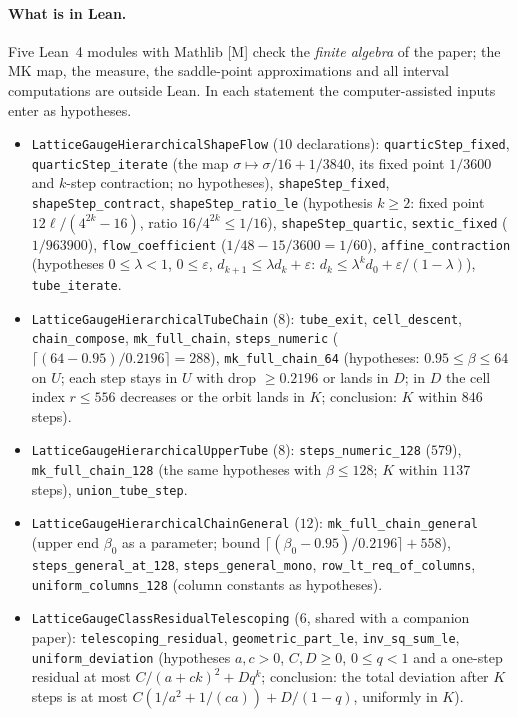 \documentclass[11pt,a4paper]{article}
\theoremstyle{definition}
\theoremstyle{remark}
\newcommand{\code}[1]{\texttt{#1}}
\begin{document}
{\sloppy
\paragraph{What is in Lean.}
Five Lean~4 modules with Mathlib [M] check the \emph{finite algebra} of the paper; the MK map, the measure, the saddle-point approximations and all interval computations are outside Lean.
In each statement the computer-assisted inputs enter as hypotheses.
\begin{itemize}[nosep]
\item \code{LatticeGaugeHierarchicalShapeFlow} ($10$ declarations): \code{quarticStep\_fixed}, \code{quarticStep\_iterate} (the map $\sigma\mapsto\sigma/16+1/3840$, its fixed point $1/3600$ and $k$-step contraction; no hypotheses), \code{shapeStep\_fixed}, \code{shapeStep\_contract}, \code{shapeStep\_ratio\_le} (hypothesis $k\ge2$: fixed point $12\ell/(4^{2k}-16)$, ratio $16/4^{2k}\le1/16$), \code{shapeStep\_quartic}, \code{sextic\_fixed} ($1/963900$), \code{flow\_coefficient} ($1/48-15/3600=1/60$), \code{affine\_contraction} (hypotheses $0\le\lambda<1$, $0\le\varepsilon$, $d_{k+1}\le\lambda d_k+\varepsilon$: $d_k\le\lambda^kd_0+\varepsilon/(1-\lambda)$), \code{tube\_iterate}.
\item \code{LatticeGaugeHierarchicalTubeChain} ($8$): \code{tube\_exit}, \code{cell\_descent}, \code{chain\_compose}, \code{mk\_full\_chain}, \code{steps\_numeric} ($\lceil(64-0.95)/0.2196\rceil=288$), \code{mk\_full\_chain\_64} (hypotheses: $0.95\le\beta\le64$ on $U$; each step stays in $U$ with drop $\ge0.2196$ or lands in $D$; in $D$ the cell index $r\le556$ decreases or the orbit lands in $K$; conclusion: $K$ within $846$ steps).
\item \code{LatticeGaugeHierarchicalUpperTube} ($8$): \code{steps\_numeric\_128} ($579$), \code{mk\_full\_chain\_128} (the same hypotheses with $\beta\le128$; $K$ within $1137$ steps), \code{union\_tube\_step}.
\item \code{LatticeGaugeHierarchicalChainGeneral} ($12$): \code{mk\_full\_chain\_general} (upper end $\beta_0$ as a parameter; bound $\lceil(\beta_0-0.95)/0.2196\rceil+558$), \code{steps\_general\_at\_128}, \code{steps\_general\_mono}, \code{row\_lt\_req\_of\_columns}, \code{uniform\_columns\_128} (column constants as hypotheses).
\item \code{LatticeGaugeClassResidualTelescoping} ($6$, shared with a companion paper): \code{telescoping\_residual}, \code{geometric\_part\_le}, \code{inv\_sq\_sum\_le}, \code{uniform\_deviation} (hypotheses $a,c>0$, $C,D\ge0$, $0\le q<1$ and a one-step residual at most $C/(a+ck)^2+Dq^k$; conclusion: the total deviation after $K$ steps is at most $C(1/a^2+1/(ca))+D/(1-q)$, uniformly in $K$).
\end{itemize}

\par}
\end{document}
